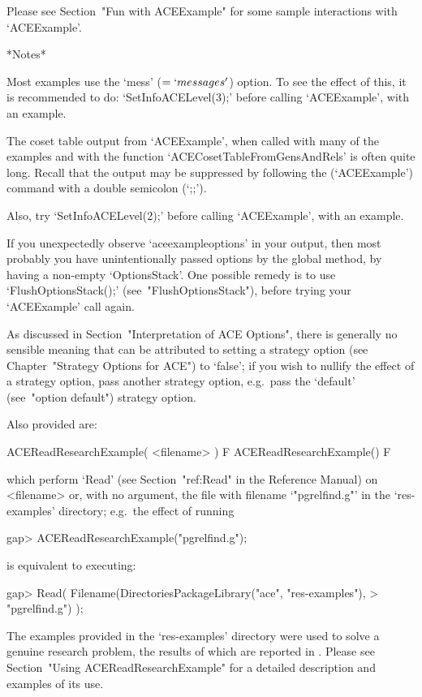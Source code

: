 Please see Section~"Fun with ACEExample" for some sample  interactions
with `ACEExample'.

*Notes*

Most examples use the `mess'  ($=  `messages'$)  option.  To  see  the
effect of this, it is recommended to do: `SetInfoACELevel(3);'  before
calling `ACEExample', with an example.

The coset table output from `ACEExample', when called with many of the
examples and with the {\ACE}  function  `ACECosetTableFromGensAndRels'
is often quite long. Recall that  the  output  may  be  suppressed  by
following the (`ACEExample') command with a double semicolon (`;;').

Also, try `SetInfoACELevel(2);' before  calling `ACEExample', with  an
example.

If you unexpectedly observe `aceexampleoptions' in your  output,  then
most probably you have unintentionally passed options  by  the  global
method, by having a non-empty `OptionsStack'. One possible  remedy  is
to use `FlushOptionsStack();' (see~"FlushOptionsStack"), before trying
your `ACEExample' call again.

As discussed in Section~"Interpretation  of  ACE  Options",  there  is
generally no sensible meaning that can  be  attributed  to  setting  a
strategy option (see Chapter~"Strategy Options for ACE")  to  `false';
if you wish to nullify the effect of a strategy option,  pass  another
strategy  option,  e.g.~pass  the  `default'  (see~"option   default")
strategy option.

Also provided are:

\> ACEReadResearchExample( <filename> ) F
\> ACEReadResearchExample() F

which perform `Read' (see Section~"ref:Read" in the  {\GAP}  Reference
Manual) on <filename> or, with no argument,  the  file  with  filename
`"pgrelfind.g"' in the `res-examples' directory;  e.g.~the  effect  of
running

\beginexample
gap> ACEReadResearchExample("pgrelfind.g");

\endexample

is equivalent to executing:

\beginexample
gap> Read( Filename(DirectoriesPackageLibrary("ace", "res-examples"),
>                   "pgrelfind.g") );

\endexample

The examples provided in the `res-examples'  directory  were  used  to
solve a genuine research problem, the results of which are reported in
\cite{CHHR01}. Please see Section~"Using  ACEReadResearchExample"  for
a detailed description and examples of its use.

